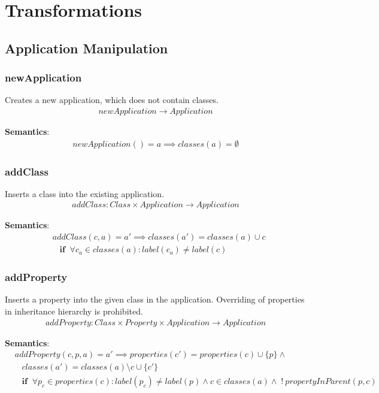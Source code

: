 \documentclass[10pt]{article}
\begin{document}
\section{Transformations}
\label{sec:transformations}
\subsection{Application Manipulation}
\subsubsection{newApplication}
Creates a new application, which does not contain classes.
\begin{align}
newApplication \rightarrow Application
\end{align}

\noindent \textbf{Semantics}:
\begin{align}
newApplication() = a \implies classes(a) = \emptyset
\end{align}

\subsubsection{addClass}
Inserts a class into the existing application.
\begin{align}
addClass: Class \times Application \rightarrow Application
\end{align}

\noindent \textbf{Semantics}:
\begin{align}
& addClass(c, a) = a' \implies classes(a') = classes(a) \cup c \nonumber \\
& \;\;\; \mathbf{if} \;\; \forall c_a \in classes(a): label(c_a) \neq label(c)
\end{align}

\subsubsection{addProperty}
Inserts a property into the given class in the application. Overriding of properties in inheritance hierarchy is prohibited.
\begin{align}
addProperty: Class \times Property \times Application \rightarrow Application 
\end{align}

\noindent \textbf{Semantics}:
\begin{align}
& addProperty(c, p, a) = a' \implies properties(c') = properties(c) \cup \{ p \}  \land \nonumber \\
& \;\;\; classes(a') = classes(a) \setminus c  \cup \{c'\}  \nonumber \\
& \;\;\; \mathbf{if} \;\; \forall p_c \in properties(c) : label(p_c) \neq label(p) \land c \in classes(a) \land \; !\:propertyInParent(p, c)
\end{align}
\end{document}
